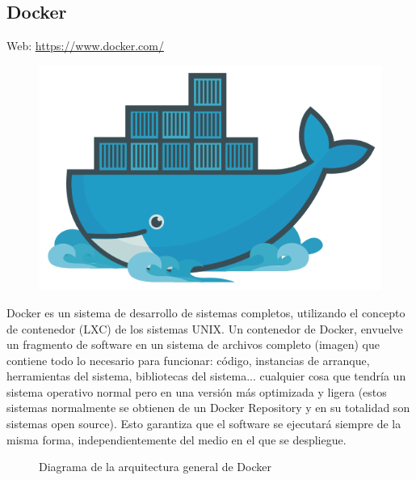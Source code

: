 \subsection{Docker}
Web: \url{https://www.docker.com/}\\
\begin{figure}[H]
  \begin{center}
    \includegraphics[scale=0.5]{diagramas/docker-logo.png}
  \end{center}
\end{figure}

Docker es un sistema de desarrollo de sistemas completos, utilizando el concepto de contenedor (LXC) de los sistemas UNIX. Un contenedor de Docker, envuelve un fragmento de software en un sistema de archivos completo (imagen) que contiene todo lo necesario para funcionar: código, instancias de arranque, herramientas del sistema, bibliotecas del sistema... cualquier cosa que tendría un sistema operativo normal pero en una versión más optimizada y ligera (estos sistemas normalmente se obtienen de un Docker Repository y en su totalidad son sistemas open source). Esto garantiza que el software se ejecutará siempre de la misma forma, independientemente del medio en el que se despliegue.\\

\begin{figure}[H]
  \caption{Diagrama de la arquitectura general de Docker}
\end{figure}
\newpage
